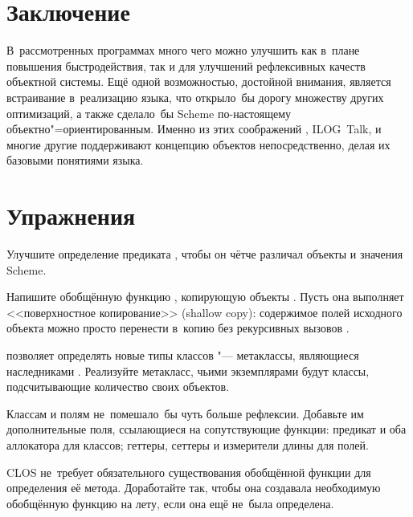\section{Заключение}\label{objects/sect:conclusions}

В~рассмотренных программах много чего можно улучшить как в~плане повышения
быстродействия, так и для улучшений рефлексивных качеств объектной системы.
Ещё одной возможностью, достойной внимания, является встраивание {\Meroonet}
в~реализацию языка, что открыло~бы дорогу множеству других оптимизаций, а также
сделало~бы Scheme по-настоящему объектно"=ориентированным. Именно из этих
соображений {\EuLisp}, ILOG~Talk, {\CommonLisp} и многие другие поддерживают
концепцию объектов непосредственно, делая их базовыми понятиями языка.


\section{Упражнения}\label{objects/sect:exercises}

\begin{exercise}\label{objects/ex:precise-predicate}
Улучшите определение предиката , чтобы он чётче различал объекты и
значения Scheme.
\end{exercise}

\begin{exercise}\label{objects/ex:clone}
Напишите обобщённую функцию , копирующую объекты {\Meroonet}. Пусть
она выполняет <<поверхностное копирование>> (shallow copy): содержимое полей
исходного объекта можно просто перенести в~копию без рекурсивных вызовов
.
\end{exercise}

\begin{exercise}\label{objects/ex:metaclass}
{\Meroonet} позволяет определять новые типы классов "--- метаклассы, являющиеся
наследниками . Реализуйте метакласс, чьими экземплярами будут классы,
подсчитывающие количество своих объектов.
\end{exercise}

\begin{exercise}\label{objects/ex:field-reflection}
Классам и полям {\Meroonet} не~помешало~бы чуть больше рефлексии. Добавьте им
дополнительные поля, ссылающиеся на сопутствующие функции: предикат и оба
аллокатора для классов; геттеры, сеттеры и измерители длины для полей.
\end{exercise}

\begin{exercise}\label{objects/ex:auto-generic}
CLOS не~требует обязательного существования обобщённой функции для определения
её метода. Доработайте  так, чтобы она создавала необходимую
обобщённую функцию на лету, если она ещё не~была определена.
\end{exercise}

